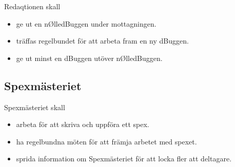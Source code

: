 \documentclass{dgovdoc}
\begin{document}
Redaqtionen skall

\begin{itemize}
\item ge ut en nØlledBuggen under mottagningen.
\item träffas regelbundet för att arbeta fram en ny dBuggen.
\item ge ut minst en dBuggen utöver nØlledBuggen.
\end{itemize}

\subsection{Spexmästeriet}

Spexmästeriet skall

\begin{itemize}
\item arbeta för att skriva och uppföra ett spex.
\item ha regelbundna möten för att främja arbetet med spexet.
\item sprida information om Spexmästeriet för att locka fler att deltagare.
\end{itemize}
\end{document}
